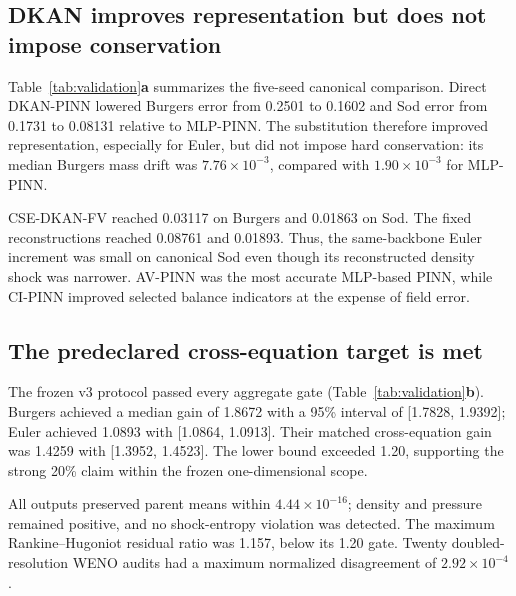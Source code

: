 \documentclass[10pt,twocolumn]{article}
\newcommand{\method}{CSE-DKAN-FV}
\begin{document}
\FloatBarrier
\onecolumn
\noindent\begin{minipage}[t]{0.48\textwidth}
\small
\subsection{DKAN improves representation but does not impose conservation}
Table~\ref{tab:validation}\textbf{a} summarizes the five-seed canonical comparison. Direct DKAN-PINN lowered Burgers error from 0.2501 to 0.1602 and Sod error from 0.1731 to 0.08131 relative to MLP-PINN. The substitution therefore improved representation, especially for Euler, but did not impose hard conservation: its median Burgers mass drift was $7.76\times10^{-3}$, compared with $1.90\times10^{-3}$ for MLP-PINN.

\method{} reached 0.03117 on Burgers and 0.01863 on Sod. The fixed reconstructions reached 0.08761 and 0.01893. Thus, the same-backbone Euler increment was small on canonical Sod even though its reconstructed density shock was narrower. AV-PINN was the most accurate MLP-based PINN, while CI-PINN improved selected balance indicators at the expense of field error.
\end{minipage}\hfill
\begin{minipage}[t]{0.48\textwidth}
\small
\subsection{The predeclared cross-equation target is met}
The frozen v3 protocol passed every aggregate gate (Table~\ref{tab:validation}\textbf{b}). Burgers achieved a median gain of 1.8672 with a 95\% interval of [1.7828, 1.9392]; Euler achieved 1.0893 with [1.0864, 1.0913]. Their matched cross-equation gain was 1.4259 with [1.3952, 1.4523]. The lower bound exceeded 1.20, supporting the strong 20\% claim within the frozen one-dimensional scope.

All outputs preserved parent means within $4.44\times10^{-16}$; density and pressure remained positive, and no shock-entropy violation was detected. The maximum Rankine--Hugoniot residual ratio was 1.157, below its 1.20 gate. Twenty doubled-resolution WENO audits had a maximum normalized disagreement of $2.92\times10^{-4}$.
\end{minipage}
\end{document}
